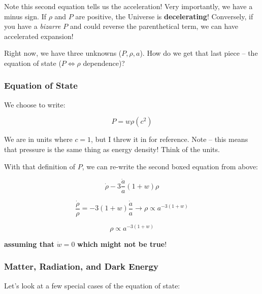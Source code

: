 \documentclass{article}
\def\iff{\Leftrightarrow}
\def\iff{\Leftrightarrow}
\begin{document}
Note this second equation tells us the acceleration! Very importantly, we have a minus sign. If $\rho$ and $P$ are positive, the Universe is \textbf{decelerating}! Conversely, if you have a \textit{bizarre} $P$ and could reverse the parenthetical term, we can have accelerated expansion! 


Right now, we have three unknowns ($P, \rho, a$). How do we get that last piece -- the equation of state ($P \iff \rho$ dependence)?

\subsubsection{Equation of State}

We choose to write:

\begin{equation}
    P = w\rho (c^2)
\end{equation}

We are in units where $c = 1$, but I threw it in for reference. Note -- this means that pressure is the same thing as energy density! Think of the units. 

With that definition of $P$, we can re-write the second boxed equation from above:

\begin{equation}
    \dot{\rho} -3\frac{\dot{a}}{a}\left(1+w\right)\rho
\end{equation}

\begin{equation}
    \frac{\dot{\rho}}{\rho} = -3 (1+w) \frac{\dot{a}}{a} \rightarrow \rho \propto a ^{-3(1+w)}
\end{equation}

\begin{equation}
    \boxed{\rho \propto a^{-3\left(1+w\right)}}
\end{equation}

\textbf{assuming that} $\dot{w} =0$ \textbf{which might not be true}!

\subsubsection{Matter, Radiation, and Dark Energy}

Let's look at a few special cases of the equation of state:
\end{document}
